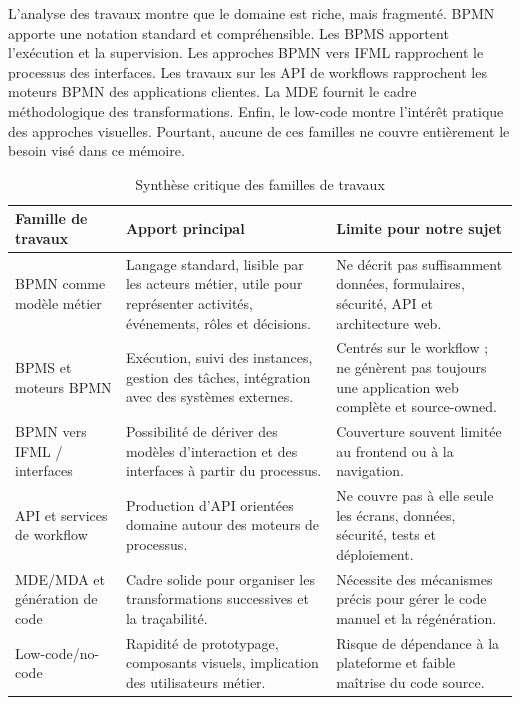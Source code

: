 
L'analyse des travaux montre que le domaine est riche, mais fragmenté.
BPMN apporte une notation standard et compréhensible. Les BPMS apportent
l'exécution et la supervision. Les approches BPMN vers IFML rapprochent
le processus des interfaces. Les travaux sur les API de workflows
rapprochent les moteurs BPMN des applications clientes. La MDE fournit
le cadre méthodologique des transformations. Enfin, le low-code montre
l'intérêt pratique des approches visuelles. Pourtant, aucune de ces
familles ne couvre entièrement le besoin visé dans ce mémoire.

\begin{table}[H]
\caption{Synthèse critique des familles de travaux}
\label{tab:synthese-critique-familles}
\centering
\footnotesize
\renewcommand{\arraystretch}{1.2}
\begin{tabular}{|p{3.3cm}|p{4.8cm}|p{5.2cm}|}
\hline
\textbf{Famille de travaux} & \textbf{Apport principal} & \textbf{Limite pour notre sujet} \\
\hline
BPMN comme modèle métier & Langage standard, lisible par les acteurs
métier, utile pour représenter activités, événements, rôles et
décisions. & Ne décrit pas suffisamment données, formulaires, sécurité,
API et architecture web. \\
\hline
BPMS et moteurs BPMN & Exécution, suivi des instances, gestion des
tâches, intégration avec des systèmes externes. & Centrés sur le
workflow ; ne génèrent pas toujours une application web complète et
source-owned. \\
\hline
BPMN vers IFML / interfaces & Possibilité de dériver des modèles
d'interaction et des interfaces à partir du processus. & Couverture
souvent limitée au frontend ou à la navigation. \\
\hline
API et services de workflow & Production d'API orientées domaine autour
des moteurs de processus. & Ne couvre pas à elle seule les écrans,
données, sécurité, tests et déploiement. \\
\hline
MDE/MDA et génération de code & Cadre solide pour organiser les
transformations successives et la traçabilité. & Nécessite des
mécanismes précis pour gérer le code manuel et la régénération. \\
\hline
Low-code/no-code & Rapidité de prototypage, composants visuels,
implication des utilisateurs métier. & Risque de dépendance à la
plateforme et faible maîtrise du code source. \\
\hline
\end{tabular}
\end{table}

